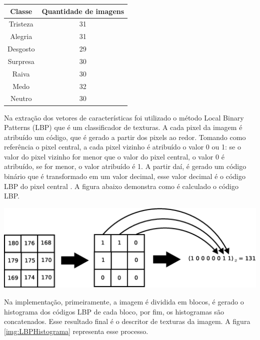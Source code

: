 \begin{itemize}
\begin{center}
	\begin{tabular}{cc}
        \hline
        Classe & Quantidade de imagens \\
        \hline
		Tristeza & 31 \\
		Alegria & 31 \\
		Desgosto & 29 \\
		Surpresa & 30 \\
		Raiva & 30 \\
		Medo & 32 \\
		Neutro & 30 \\
        \hline
	\end{tabular}
        \label{tab:tabela_expressoes}
\end{center}

Na extração dos vetores de características foi utilizado o método Local Binary Patterns (LBP) que é um classificador de texturas. A cada pixel da imagem é atribuído um código, que é gerado a partir dos pixels ao redor. Tomando como referência o pixel central, a cada pixel vizinho é atribuído o valor 0 ou 1: se o valor do pixel vizinho for menor que o valor do pixel central, o valor 0 é atribuído, se for menor, o valor atribuído é 1. A partir daí, é gerado um código binário que é transformado em um valor decimal, esse valor decimal é o código LBP do pixel central \cite{LBPShan2009}. A figura abaixo demonstra como é calculado o código LBP.

\begin{center}
	\includegraphics[scale=0.5]{graficos/LBP}
	\label{img:LBP}
\end{center}

Na implementação, primeiramente, a imagem é dividida em blocos, é gerado o histograma dos códigos LBP de cada bloco, por fim, os histogramas são concatenados. Esse resultado final é o descritor de texturas da imagem. A figura \ref{img:LBPHistograma} representa esse processo.


\end{itemize}

